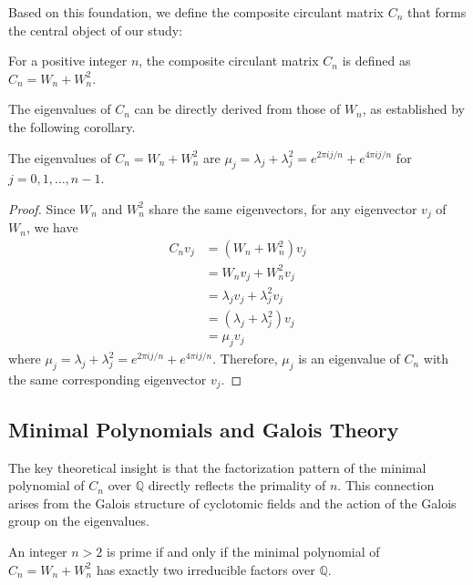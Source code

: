 Based on this foundation, we define the composite circulant matrix $C_n$ that forms the central object of our study:

\begin{definition}
For a positive integer $n$, the composite circulant matrix $C_n$ is defined as $C_n = W_n + W_n^2$.
\end{definition}

The eigenvalues of $C_n$ can be directly derived from those of $W_n$, as established by the following corollary.

\begin{corollary}[Eigenvalues of $C_n$]\label{cor:eigenvalues_C}
The eigenvalues of $C_n = W_n + W_n^2$ are $\mu_j = \lambda_j + \lambda_j^2 = e^{2\pi i j/n} + e^{4\pi i j/n}$ for $j = 0, 1, \ldots, n-1$.
\end{corollary}

\begin{proof}
Since $W_n$ and $W_n^2$ share the same eigenvectors, for any eigenvector $v_j$ of $W_n$, we have
\begin{align}
C_n v_j &= (W_n + W_n^2) v_j \\
&= W_n v_j + W_n^2 v_j \\
&= \lambda_j v_j + \lambda_j^2 v_j \\
&= (\lambda_j + \lambda_j^2) v_j \\
&= \mu_j v_j
\end{align}
where $\mu_j = \lambda_j + \lambda_j^2 = e^{2\pi i j/n} + e^{4\pi i j/n}$. Therefore, $\mu_j$ is an eigenvalue of $C_n$ with the same corresponding eigenvector $v_j$.
\end{proof}

\subsection{Minimal Polynomials and Galois Theory}

The key theoretical insight is that the factorization pattern of the minimal polynomial of $C_n$ over $\mathbb{Q}$ directly reflects the primality of $n$. This connection arises from the Galois structure of cyclotomic fields and the action of the Galois group on the eigenvalues.

\begin{theorem}\label{thm:main}
An integer $n > 2$ is prime if and only if the minimal polynomial of $C_n = W_n + W_n^2$ has exactly two irreducible factors over $\mathbb{Q}$.
\end{theorem}

